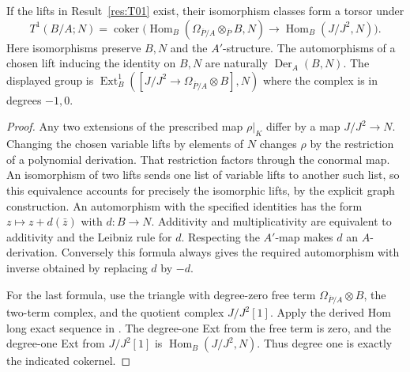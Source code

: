 \begin{proposition}\label{res:T02}
If the lifts in Result~\ref{res:T01} exist, their isomorphism
classes form a torsor under
\[
 T^1(B/A;N)=
 \operatorname{coker}\bigl(
  \operatorname{Hom}_B(\Omega_{\overline P/A}\otimes_{\overline P}B,N)
  \longrightarrow \operatorname{Hom}_B(J/J^2,N)\bigr).
\]
Here isomorphisms preserve \(B,N\) and the \(A'\)-structure.
The automorphisms of a chosen lift inducing the identity on
\(B,N\) are naturally \(\operatorname{Der}_A(B,N)\).
The displayed group is
\(\operatorname{Ext}^1_B([J/J^2\to\Omega_{\overline P/A}\otimes B],N)\)
where the complex is in degrees \(-1,0\).
\end{proposition}
\begin{proof}
Any two extensions of the prescribed map \(\rho|_K\) differ by a
map \(J/J^2\to N\). Changing the chosen variable lifts by elements
of \(N\) changes \(\rho\) by the restriction of a polynomial
derivation. That restriction factors through the conormal map.
An isomorphism of two lifts sends one list of variable lifts to
another such list, so this equivalence accounts for precisely the
isomorphic lifts, by the explicit graph construction.
An automorphism with the specified identities has the form
\(z\mapsto z+d(\bar z)\) with \(d:B\to N\). Additivity and
multiplicativity are equivalent to additivity and the Leibniz
rule for \(d\). Respecting the \(A'\)-map makes \(d\) an
\(A\)-derivation. Conversely this formula always gives the required
automorphism with inverse obtained by replacing \(d\) by \(-d\).

For the last formula, use the triangle with degree-zero free
term \(\Omega_{\overline P/A}\otimes B\), the two-term complex,
and the quotient complex \(J/J^2[1]\). Apply the derived Hom
long exact sequence in \cite[R11]{homological}. The degree-one
Ext from the free term is zero, and the degree-one Ext from
\(J/J^2[1]\) is \(\operatorname{Hom}_B(J/J^2,N)\).
Thus degree one is exactly the indicated cokernel.
\end{proof}

